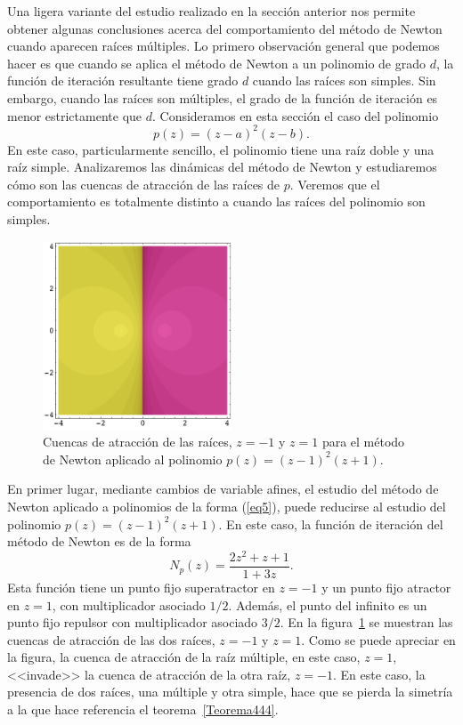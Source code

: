 Una ligera variante del estudio realizado en la sección anterior nos permite obtener algunas conclusiones acerca del comportamiento del método de Newton cuando aparecen raíces múltiples.
Lo primero observación general que podemos hacer es que cuando se aplica el método de Newton a un polinomio de grado $d$, la función de iteración resultante tiene grado $d$ cuando las raíces son simples. Sin embargo, cuando las raíces son múltiples, el grado de la función de iteración es menor estrictamente que $d$.
Consideramos en esta sección el caso del polinomio
\begin{equation}\label{eq5}
p(z)=(z-a)^2(z-b).
\end{equation}
 En este caso, particularmente sencillo, el polinomio tiene una raíz doble y una raíz simple. Analizaremos las dinámicas del método de Newton y  estudiaremos cómo son las cuencas de atracción de las raíces de $p$. Veremos que el comportamiento es totalmente distinto a cuando las raíces del polinomio son simples.

\begin{figure}[htb]
\centering
\includegraphics[width=0.5\textwidth]{NDfigura0.pdf}
\caption{Cuencas de atracción de las raíces, $z=-1$ y  $z=1$ para el método de Newton aplicado al polinomio $p(z)=(z-1)^2(z+1)$.}
\label{fig4:41}
\end{figure}

 En primer lugar, mediante cambios de variable afines, el estudio del método de Newton aplicado a polinomios de la forma (\ref{eq5}), puede reducirse al estudio del polinomio $p(z)=(z-1)^2(z+1)$. En este caso, la función de iteración del método de Newton es de la forma
 $$
 N_p(z)=\frac{2z^2+z+1}{1+3z}.
 $$
 Esta función tiene un punto fijo superatractor en $z=-1$ y un punto fijo atractor en $z=1$, con multiplicador asociado $1/2$. Además, el punto del infinito es un punto fijo repulsor con multiplicador asociado $3/2$. En la figura~\ref{fig4:41} se muestran las cuencas de atracción de las dos raíces, $z=-1$ y  $z=1$. Como se puede apreciar en la figura, la cuenca de atracción de la raíz múltiple, en este caso, $z=1$, <<invade>> la cuenca de atracción de la otra raíz, $z=-1$.  En este caso, la presencia  de dos raíces, una múltiple y otra simple,  hace que se pierda la simetría a la que hace referencia el teorema~\ref{Teorema444}.

